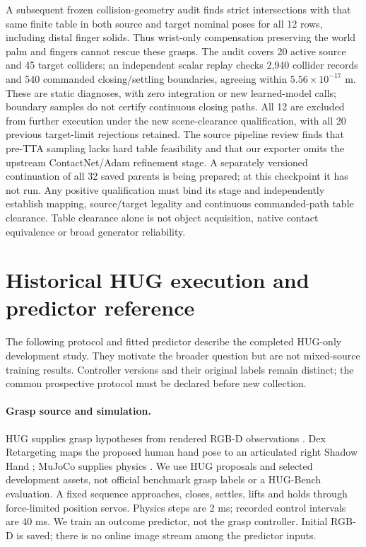 \documentclass[10pt,letterpaper]{article}
\begin{document}
A subsequent frozen collision-geometry audit finds strict intersections with
that same finite table in both source and target nominal poses for all 12 rows,
including distal finger solids. Thus wrist-only compensation preserving the
world palm and fingers cannot rescue these grasps. The audit covers 20 active
source and 45 target colliders; an independent scalar replay checks 2,940
collider records and 540 commanded closing/settling boundaries, agreeing within
$5.56\times10^{-17}$ m. These are static diagnoses, with zero integration or
new learned-model calls; boundary samples do not certify continuous closing
paths. All 12 are excluded from further execution under the new scene-clearance
qualification, with all 20 previous target-limit rejections retained. The source
pipeline review finds that pre-TTA sampling lacks hard table feasibility and
that our exporter omits the upstream ContactNet/Adam refinement stage. A
separately versioned continuation of all 32 saved parents is being prepared;
at this checkpoint it has not run. Any positive qualification must bind its
stage and independently establish mapping, source/target legality and continuous
commanded-path table clearance. Table clearance alone is not object acquisition,
native contact equivalence or broad generator reliability.

\section{Historical HUG execution and predictor reference}
The following protocol and fitted predictor describe the completed HUG-only
development study. They motivate the broader question but are not mixed-source
training results. Controller versions and their original labels remain distinct;
the common prospective protocol must be declared before new collection.
\paragraph{Grasp source and simulation.}
HUG supplies grasp hypotheses from rendered RGB-D observations \cite{hug}.
Dex Retargeting maps the proposed human hand pose to an articulated right
Shadow Hand \cite{dex}; MuJoCo supplies physics \cite{mujoco}. We use HUG
proposals and selected development assets, not official benchmark grasp labels
or a HUG-Bench evaluation. A fixed sequence approaches, closes, settles, lifts
and holds through force-limited position servos. Physics steps are 2 ms;
recorded control intervals are 40 ms. We train an outcome predictor, not the
grasp controller. Initial RGB-D is saved; there is no online image stream among
the predictor inputs.
\end{document}
